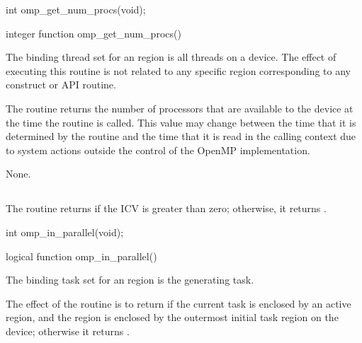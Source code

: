 \format
\ccppspecificstart
\begin{boxedcode}
int omp\_get\_num\_procs(void);
\end{boxedcode}
\ccppspecificend

\fortranspecificstart
\begin{boxedcode}
integer function omp\_get\_num\_procs()
\end{boxedcode}
\fortranspecificend

\binding
The binding thread set for an  region is all threads on a device. 
The effect of executing this routine is not related to any specific region corresponding to 
any construct or API routine.

\effect
The  routine returns the number of processors that are available 
to the device at the time the routine is called. This value may change between 
the time that it is determined by the  routine and the time that it 
is read in the calling context due to system actions outside the control of the OpenMP 
implementation.

\crossreferences
None.







\subsection{}
\label{subsec:omp_in_parallel}
\summary
The  routine returns  if the  ICV is greater 
than zero; otherwise, it returns .

\pagebreak
\format
\ccppspecificstart
\begin{boxedcode}
int omp\_in\_parallel(void);
\end{boxedcode}
\ccppspecificend

\fortranspecificstart
\begin{boxedcode}
logical function omp\_in\_parallel()
\end{boxedcode}
\fortranspecificend

\binding
The binding task set for an  region is the generating task.

\effect
The effect of the  routine is to return  if the current task is 
enclosed by an active  region, and the  region is enclosed by the 
outermost initial task region on the device; otherwise it returns .

